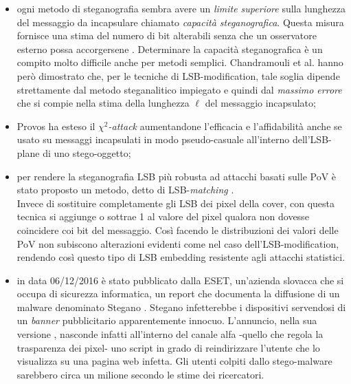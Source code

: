 		\begin{itemize}
		\item ogni metodo di steganografia sembra avere un \textit{limite superiore} sulla lunghezza del messaggio da incapsulare chiamato \textit{capacità steganografica}. Questa misura fornisce una stima del numero di bit alterabili senza che un osservatore esterno possa accorgersene \cite{fried1}. Determinare la capacità steganografica è un compito molto difficile anche per metodi semplici. Chandramouli et al. \cite{sup} hanno però dimostrato che, per le tecniche di LSB-modification, tale soglia dipende strettamente dal metodo steganalitico impiegato e quindi dal \textit{massimo errore} che si compie nella stima della lunghezza $\ell$ del messaggio incapsulato;
		\item Provos \cite{provos} ha esteso il $\chi^2$\textit{-attack} aumentandone l'efficacia e l'affidabilità anche se usato su messaggi incapsulati in modo pseudo-casuale all'interno dell'LSB-plane di uno stego-oggetto;
		\item per rendere la steganografia LSB più robusta ad attacchi basati sulle PoV è stato proposto un metodo, detto di LSB-\textit{matching} \cite{mat1, mat2}.\\Invece di sostituire completamente gli LSB dei pixel della cover, con questa tecnica si aggiunge o sottrae 1 al valore del pixel qualora non dovesse coincidere coi bit del messaggio. Così facendo le distribuzioni dei valori delle PoV non subiscono alterazioni evidenti come nel caso dell'LSB-modification, rendendo così questo tipo di LSB embedding resistente agli attacchi statistici.
		\item in data 06/12/2016 è stato pubblicato dalla ESET, un'azienda slovacca che si occupa di sicurezza informatica, un report che documenta la diffusione di un malware denominato Stegano \cite{sito}. Stegano infetterebbe i dispositivi servendosi di un \textit{banner} pubblicitario apparentemente innocuo. L'annuncio, nella sua versione , nasconde infatti all'interno del canale alfa -quello che regola la trasparenza dei pixel- uno script in grado di reindirizzare l'utente che lo visualizza su una pagina web infetta. Gli utenti colpiti dallo stego-malware sarebbero circa un milione secondo le stime dei ricercatori.
		\end{itemize}
